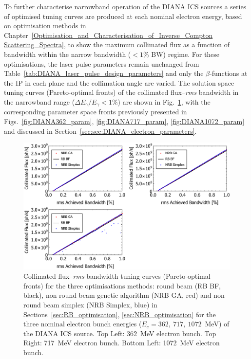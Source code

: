 \documentclass[../main.tex]{subfiles}
\begin{document}
To further characterise narrowband operation of the DIANA ICS sources a series of optimised tuning curves are produced at each nominal electron energy, based on optimisation methods in Chapter~\ref{Optimisation_and_Characterisation_of_Inverse_Compton Scattering_Spectra}, to show the maximum collimated flux as a function of bandwidth within the narrow bandwidth ($<1$\%  BW) regime. For these optimisations, the laser pulse parameters remain unchanged from Table~\ref{tab:DIANA_laser_pulse_design_parameters} and only the $\beta$-functions at the IP in each plane and the collimation angle are varied. The solution space tuning curves (Pareto-optimal fronts) of the collimated flux--\textit{rms} bandwidth in the narrowband range ($\Delta E_{\gamma}/E_{\gamma} < 1$\%) are shown in Fig.~\ref{fig:DIANA_FBW}, with the corresponding parameter space fronts previously presented in Figs.~\ref{fig:DIANA362_param}, \ref{fig:DIANA717_param}, \ref{fig:DIANA1072_param} and discussed in Section~\ref{sec:sec:DIANA_electron_parameters}.  
\begin{figure}[!h]
\centering
\includegraphics[width=\textwidth]{Figures/DIANA_Inverse_Compton_Source_Design/DIANAFBW.pdf}
\caption{Collimated flux--\textit{rms} bandwidth tuning curves (Pareto-optimal fronts) for the three optimisations methods: round beam (RB BF, black), non-round beam genetic algorithm (NRB GA, red) and non-round beam simplex (NRB Simplex, blue) in Sections~\ref{sec:RB_optimisation}, \ref{sec:NRB_optimisation} for the three nominal electron bunch energies ($E_{e}=362,~717,~1072$~\si{\mega\electronvolt}) of the DIANA ICS source. Top Left: 362~\si{\mega\electronvolt} electron bunch. Top Right: 717~\si{\mega\electronvolt} electron bunch. Bottom Left: 1072~\si{\mega\electronvolt} electron bunch.}
\label{fig:DIANA_FBW}
\end{figure}
\end{document}
